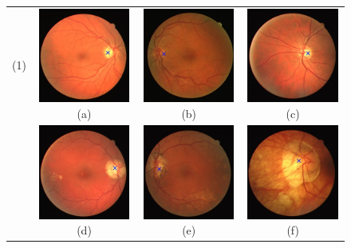 \begin{figure}[t]
    \centering
    
    \begin{tabular}{c c c c}
    	
    	{(1)} &
    	\includegraphics[width=3.0cm]{Images/Methode/Detection/Drive/02_test.jpg}{(a)} & 
    	\includegraphics[width=3.0cm]{Images/Methode/Detection/Drive/03_test.jpg}{(b)} &
    	\includegraphics[width=3.0cm]{Images/Methode/Detection/Drive/04_test.jpg}{(c)} \\
    	
    	{} &
    	\includegraphics[width=3.0cm]{Images/Methode/Detection/Drive/08_test.jpg}{(d)} & 
    	\includegraphics[width=3.0cm]{Images/Methode/Detection/Drive/26_training.jpg}{(e)} &
    	\includegraphics[width=3.0cm]{Images/Methode/Detection/Drive/34_training.jpg}{(f)} \\
    	

\end{tabular}
\end{figure}
